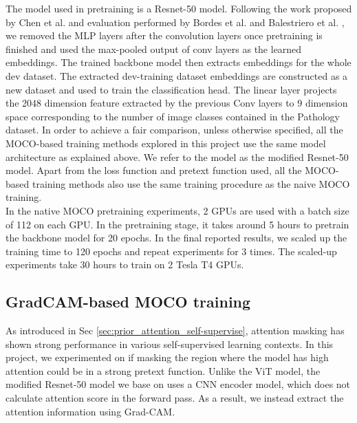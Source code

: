 \documentclass[12pt,twoside]{report}
\begin{document}
The model used in pretraining is a Resnet-50 model. Following the work proposed by Chen et al. \cite{mocov2} and evaluation performed by Bordes et al. \cite{guillotine} and Balestriero et al. \cite{cookbook}, we removed the MLP layers after the convolution layers once pretraining is finished and used the max-pooled output of conv layers as the learned embeddings. The trained backbone model then extracts embeddings for the whole dev dataset. The extracted dev-training dataset embeddings are constructed as a new dataset and used to train the classification head. The linear layer projects the 2048 dimension feature extracted by the previous Conv layers to 9 dimension space corresponding to the number of image classes contained in the Pathology dataset. In order to achieve a fair comparison, unless otherwise specified, all the MOCO-based training methods explored in this project use the same model architecture as explained above. We refer to the model as the modified Resnet-50 model. Apart from the loss function and pretext function used, all the MOCO-based training methods also use the same training procedure as the naive MOCO training.\\

In the native MOCO pretraining experiments, 2 GPUs are used with a batch size of 112 on each GPU. In the pretraining stage, it takes around 5 hours to pretrain the backbone model for 20 epochs. In the final reported results, we scaled up the training time to 120 epochs and repeat experiments for 3 times. The scaled-up experiments take 30 hours to train on 2 Tesla T4 GPUs. 


\subsection{GradCAM-based MOCO training} \label{sec:gradcamMOCO}
As introduced in Sec \ref{sec:prior_attention_self-supervise}, attention masking has shown strong performance in various self-supervised learning contexts. In this project, we experimented on if masking the region where the model has high attention could be in a strong pretext function. Unlike the ViT model, the modified Resnet-50 model we base on uses a CNN encoder model, which does not calculate attention score in the forward pass. As a result, we instead extract the attention information using Grad-CAM. \\
\end{document}
